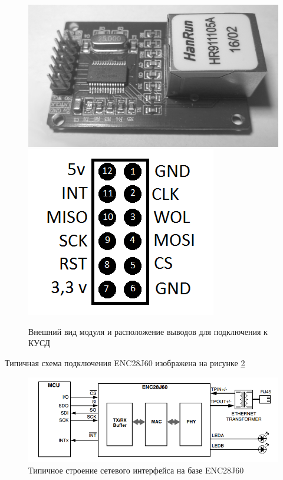 \begin{figure}[h!]
	\centering
		\includegraphics[scale=0.1]{img/ethcontroller.png}
		\includegraphics[scale=0.5]{img/ethpins.png}
	\caption{Внешний вид модуля и расположение выводов для подключения к КУСД\label{fig:ethcontroller}}
\end{figure}

Типичная схема подключения ENC28J60 изображена на рисунке \ref{fig:typicalinterface}

\begin{figure}[H]
	\centering
		\includegraphics[scale=0.6]{img/typicalinterface.png}
	\caption{Типичное строение сетевого интерфейса на базе ENC28J60\label{fig:typicalinterface} \cite{enc28j60datasheet}}
\end{figure}

